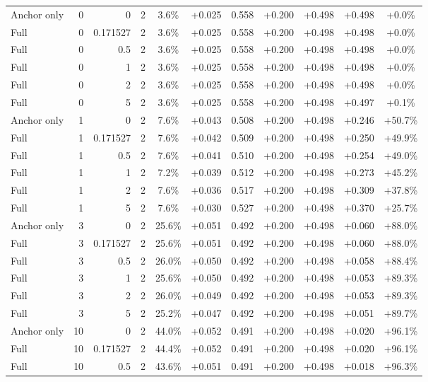 \begin{table}[htbp]
\begin{tabular}{lrrrccccccc}
Anchor only & 0 & 0 & 2 & 3.6\% & +0.025 & 0.558 & +0.200 & +0.498 & +0.498 & +0.0\% \\
Full & 0 & 0.171527 & 2 & 3.6\% & +0.025 & 0.558 & +0.200 & +0.498 & +0.498 & +0.0\% \\
Full & 0 & 0.5 & 2 & 3.6\% & +0.025 & 0.558 & +0.200 & +0.498 & +0.498 & +0.0\% \\
Full & 0 & 1 & 2 & 3.6\% & +0.025 & 0.558 & +0.200 & +0.498 & +0.498 & +0.0\% \\
Full & 0 & 2 & 2 & 3.6\% & +0.025 & 0.558 & +0.200 & +0.498 & +0.498 & +0.0\% \\
Full & 0 & 5 & 2 & 3.6\% & +0.025 & 0.558 & +0.200 & +0.498 & +0.497 & +0.1\% \\
Anchor only & 1 & 0 & 2 & 7.6\% & +0.043 & 0.508 & +0.200 & +0.498 & +0.246 & +50.7\% \\
Full & 1 & 0.171527 & 2 & 7.6\% & +0.042 & 0.509 & +0.200 & +0.498 & +0.250 & +49.9\% \\
Full & 1 & 0.5 & 2 & 7.6\% & +0.041 & 0.510 & +0.200 & +0.498 & +0.254 & +49.0\% \\
Full & 1 & 1 & 2 & 7.2\% & +0.039 & 0.512 & +0.200 & +0.498 & +0.273 & +45.2\% \\
Full & 1 & 2 & 2 & 7.6\% & +0.036 & 0.517 & +0.200 & +0.498 & +0.309 & +37.8\% \\
Full & 1 & 5 & 2 & 7.6\% & +0.030 & 0.527 & +0.200 & +0.498 & +0.370 & +25.7\% \\
Anchor only & 3 & 0 & 2 & 25.6\% & +0.051 & 0.492 & +0.200 & +0.498 & +0.060 & +88.0\% \\
Full & 3 & 0.171527 & 2 & 25.6\% & +0.051 & 0.492 & +0.200 & +0.498 & +0.060 & +88.0\% \\
Full & 3 & 0.5 & 2 & 26.0\% & +0.050 & 0.492 & +0.200 & +0.498 & +0.058 & +88.4\% \\
Full & 3 & 1 & 2 & 25.6\% & +0.050 & 0.492 & +0.200 & +0.498 & +0.053 & +89.3\% \\
Full & 3 & 2 & 2 & 26.0\% & +0.049 & 0.492 & +0.200 & +0.498 & +0.053 & +89.3\% \\
Full & 3 & 5 & 2 & 25.2\% & +0.047 & 0.492 & +0.200 & +0.498 & +0.051 & +89.7\% \\
Anchor only & 10 & 0 & 2 & 44.0\% & +0.052 & 0.491 & +0.200 & +0.498 & +0.020 & +96.1\% \\
Full & 10 & 0.171527 & 2 & 44.4\% & +0.052 & 0.491 & +0.200 & +0.498 & +0.020 & +96.1\% \\
Full & 10 & 0.5 & 2 & 43.6\% & +0.051 & 0.491 & +0.200 & +0.498 & +0.018 & +96.3\% \\

\end{tabular}
\end{table}
